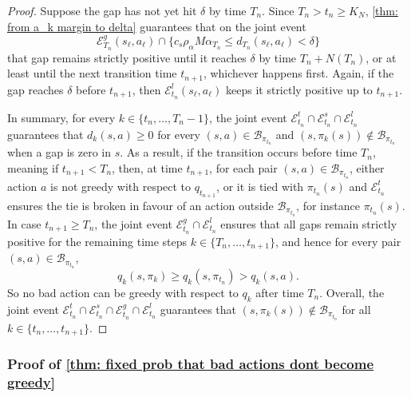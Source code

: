 \begin{proof}
Suppose the gap has not yet hit \(\delta\) by time \(T_n\). 
Since $T_n > t_n \ge K_N$,
\autoref{thm: from a_k margin to delta} guarantees that on the joint event
\[
\mathcal E^g_{T_n}(s_\ell,a_\ell) \cap
\big\{ c_s \rho_\alpha M \alpha_{T_n} \le d_{T_n}(s_\ell,a_\ell) < \delta \big\}
\]
that gap remains strictly positive until it reaches $\delta$ by time $T_n + N(T_n)$, or at least until the next transition time $t_{n+1}$, whichever happens first.
Again, if the gap reaches $\delta$ before $t_{n+1}$, then $\mathcal E^l_{t_n}(s_\ell, a_\ell)$ keeps it strictly positive up to $t_{n+1}$.

In summary,
for every $k \in \{t_n, \dots, T_n-1\}$,
the joint event $\mathcal E^t_{t_n} \cap \mathcal E^s_{t_n} \cap \mathcal E^l_{t_n}$
guarantees that $d_k(s,a) \ge 0$ for every $(s,a) \in \mathcal B_{\pi_{t_n}}$ and $(s,\pi_{k}(s)) \notin \mathcal B_{\pi_{t_n}}$ when a gap is zero in $s$.
As a result, if the transition occurs before time $T_n$, meaning if $t_{n+1} < T_n$, then, at time $t_{n+1}$,
for each pair $(s,a) \in \mathcal B_{\pi_{t_n}}$, 
either action $a$ is not greedy with respect to $q_{t_{n+1}}$,
or it is tied with $\pi_{t_{n}}(s)$ and $\mathcal E^t_{t_n}$ ensures the tie is broken in favour of an action outside $\mathcal B_{\pi_{t_n}}$, for instance $\pi_{t_{n}}(s)$.
In case $t_{n+1} \ge T_n$,
the joint event $\mathcal E^g_{t_n} \cap \mathcal E^l_{t_n}$
ensures that all gaps remain strictly positive
for the remaining time steps $k \in \{T_n, \dots, t_{n+1}\}$, and hence for every pair $(s,a) \in \mathcal B_{\pi_{t_n}}$,
\[
q_k(s, \pi_k) \ge q_k(s, \pi_{t_n}) > q_k(s,a).
\]
So no bad action can be greedy with respect to $q_k$ after time $T_n$.
Overall, the joint event $\mathcal E^t_{t_n} \cap \mathcal E^s_{t_n} \cap \mathcal E^g_{t_n} \cap \mathcal E^l_{t_n}$ guarantees that $(s,\pi_{k}(s)) \notin \mathcal B_{\pi_{t_n}}$ for all $k \in \{t_n, \dots, t_{n+1}\}$.
\end{proof}

 
\subsubsection{Proof of \autoref{thm: fixed prob that bad actions dont become greedy}}

